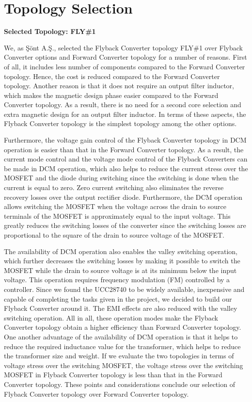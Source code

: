 \section{Topology Selection}

\textbf{Selected Topology: FLY\#1}

We, as Şönt A.Ş., selected the Flyback Converter topology FLY\#1 over Flyback Converter options and Forward Converter topology for a number of reasons. First of all, it includes less number of components compared to the Forward Converter topology. Hence, the cost is reduced compared to the Forward Converter topology. Another reason is that it does not require an output filter inductor, which makes the magnetic design phase easier compared to the Forward Converter topology. As a result, there is no need for a second core selection and extra magnetic design for an output filter inductor. In terms of these aspects, the Flyback Converter topology is the simplest topology among the other options. \par Furthermore, the voltage gain control of the Flyback Converter topology in DCM operation is easier than that in the Forward Converter topology. As a result, the current mode control and the voltage mode control of the Flyback Converters can be made in DCM operation, which also helps to reduce the current stress over the MOSFET and the diode during switching since the switching is done when the current is equal to zero. Zero current switching also eliminates the reverse recovery losses over the output rectifier diode. Furthermore, the DCM operation allows switching the MOSFET when the voltage across the drain to source terminals of the MOSFET is approximately equal to the input voltage. This greatly reduces the switching losses of the converter since the switching losses are proportional to the square of the drain to source voltage of the MOSFET. \par The availability of DCM operation also enables the valley switching operation, which further decreases the switching losses by making it possible to switch the MOSFET while the drain to source voltage is at its minimum below the input voltage. This operation requires frequency modulation (FM) controlled by a controller. Since we found the UCC28740 to be widely available, inexpensive and capable of completing the tasks given in the project, we decided to build our Flyback Converter around it. The EMI effects are also reduced with the valley switching operation.  All in all, these operation modes make the Flyback Converter topology obtain a higher efficiency than Forward Converter topology. One another advantage of the availability of DCM operation is that it helps to reduce the required inductance value for the transformer, which helps to reduce the transformer size and weight. If we evaluate the two topologies in terms of voltage stress over the switching MOSFET, the voltage stress over the switching MOSFET in Flyback Converter topology is less than that in the Forward Converter topology. These points and considerations conclude our selection of Flyback Converter topology over Forward Converter topology.

